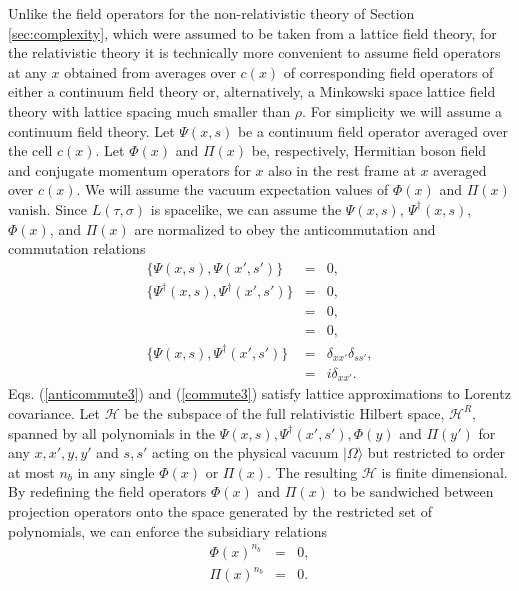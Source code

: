 \documentclass[twocolumn,amsmath,amssymb]{revtex4-1}
\begin{document}
Unlike the field operators for the non-relativistic theory of Section \ref{sec:complexity},
which were assumed to be taken from a lattice field theory, for the relativistic
theory it is technically more convenient to assume field operators at any $x$ obtained from averages
over $c(x)$ of corresponding field operators of either a continuum field theory
or, alternatively, a Minkowski space lattice field theory with lattice spacing much smaller than $\rho$.
For simplicity we will assume a continuum field theory.
Let $\Psi( x, s)$ be
a
continuum field operator averaged over the cell $c(x)$.
Let $\Phi( x)$ and $\Pi( x)$ be, respectively, Hermitian boson field and
conjugate momentum operators for $x$ also in the rest frame
at $x$ averaged over $c(x)$.
We will assume the vacuum expectation values of $\Phi(x)$ and $\Pi(x)$ vanish.
Since $L(\tau, \sigma)$ is spacelike, we can assume the $\Psi(x,s)$, $\Psi^\dagger(x,s)$,
$\Phi(x)$, and $\Pi(x)$ are normalized to
obey 
the anticommutation and commutation relations
\begin{subequations}
\begin{eqnarray}
\label{anticommute1}
\{ \Psi( x, s), \Psi( x', s') \} & = & 0, \\
\label{anticommute2}
\{ \Psi^\dagger( x, s),\Psi^\dagger( x', s') \} & = & 0,\\
\label{commute1}
[ \Phi( x), \Phi( x')] & = & 0, \\
\label{commute2}
[ \Pi( x), \Pi( x')] & = & 0, \\
\label{anticommute3}
\{\Psi( x, s),\Psi^\dagger( x', s') \} &=& \delta_{xx'} \delta_{ss'}, \\
\label{commute3}
[\Phi( x),\Pi( x') ] & = & i \delta_{xx'}.
\end{eqnarray}
\end{subequations}
Eqs. (\ref{anticommute3}) and (\ref{commute3}) satisfy lattice approximations to Lorentz covariance.
Let $\mathcal{H}$ be the subspace of the full relativistic Hilbert space, $\mathcal{H}^R$,
spanned by all polynomials in
the $\Psi( x, s), \Psi^\dagger( x', s'),\Phi( y)$ and $\Pi( y')$
for any $x, x', y, y'$ and $s, s'$ acting on the physical vacuum $|\Omega \rangle $
but restricted to order at most $n_b$ in any single $\Phi(x)$ or $\Pi(x)$.
The resulting $\mathcal{H}$ is finite dimensional.
By redefining the field operators $\Phi(x)$ and $\Pi(x)$
to be sandwiched between projection operators onto the space generated
by the restricted set of polynomials, we can enforce
the subsidiary relations
\begin{subequations}
  \begin{eqnarray}
    \label{cutoff0}
    \Phi( x)^{n_b} & = & 0, \\
    \label{cutoff1}
    \Pi( x)^{n_b} & = & 0.
  \end{eqnarray}
\end{subequations}
\end{document}
